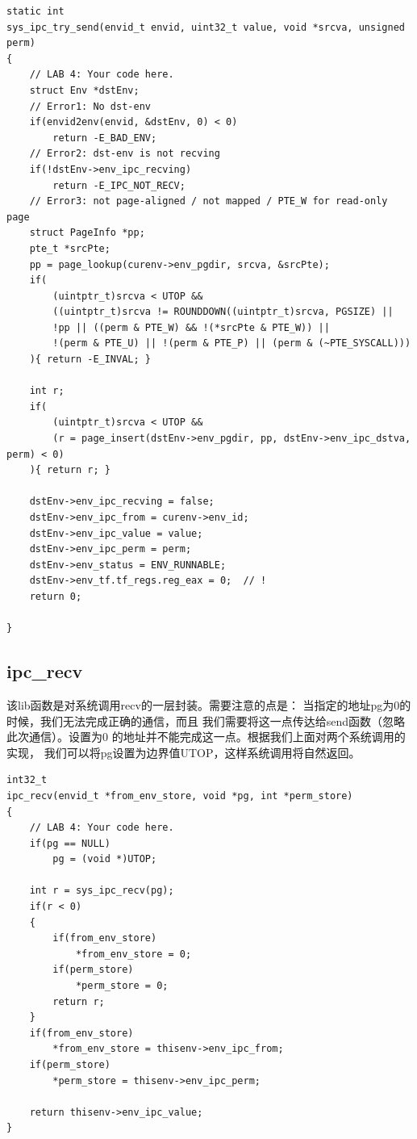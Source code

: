 \documentclass[12pt, letterpaper]{report}
\begin{document}
\lstset{style=CStyle}
\setmainfont{Consolas}
\begin{lstlisting}
static int
sys_ipc_try_send(envid_t envid, uint32_t value, void *srcva, unsigned perm)
{
    // LAB 4: Your code here.
    struct Env *dstEnv;
    // Error1: No dst-env
    if(envid2env(envid, &dstEnv, 0) < 0)
        return -E_BAD_ENV;
    // Error2: dst-env is not recving
    if(!dstEnv->env_ipc_recving)
        return -E_IPC_NOT_RECV;
    // Error3: not page-aligned / not mapped / PTE_W for read-only page
    struct PageInfo *pp;
    pte_t *srcPte;
    pp = page_lookup(curenv->env_pgdir, srcva, &srcPte);
    if(
        (uintptr_t)srcva < UTOP &&
        ((uintptr_t)srcva != ROUNDDOWN((uintptr_t)srcva, PGSIZE) ||
        !pp || ((perm & PTE_W) && !(*srcPte & PTE_W)) ||
        !(perm & PTE_U) || !(perm & PTE_P) || (perm & (~PTE_SYSCALL)))
    ){ return -E_INVAL; }

    int r;
    if(
        (uintptr_t)srcva < UTOP && 
        (r = page_insert(dstEnv->env_pgdir, pp, dstEnv->env_ipc_dstva, perm) < 0)
    ){ return r; }

    dstEnv->env_ipc_recving = false;
    dstEnv->env_ipc_from = curenv->env_id;
    dstEnv->env_ipc_value = value;
    dstEnv->env_ipc_perm = perm;
    dstEnv->env_status = ENV_RUNNABLE;
    dstEnv->env_tf.tf_regs.reg_eax = 0;  // !
    return 0;
    
}
\end{lstlisting}
\setmainfont{Times New Roman}

\newpage
\subsection{ipc\_recv}
该lib函数是对系统调用recv的一层封装。需要注意的点是：
当指定的地址pg为0的时候，我们无法完成正确的通信，而且
我们需要将这一点传达给send函数（忽略此次通信）。设置为0
的地址并不能完成这一点。根据我们上面对两个系统调用的实现，
我们可以将pg设置为边界值UTOP，这样系统调用将自然返回。\par 
\lstset{style=CStyle}
\setmainfont{Consolas}
\begin{lstlisting}
int32_t
ipc_recv(envid_t *from_env_store, void *pg, int *perm_store)
{
    // LAB 4: Your code here.
    if(pg == NULL)
        pg = (void *)UTOP;

    int r = sys_ipc_recv(pg);
    if(r < 0)
    {
        if(from_env_store)
            *from_env_store = 0;
        if(perm_store)
            *perm_store = 0;
        return r;
    }
    if(from_env_store)
        *from_env_store = thisenv->env_ipc_from;
    if(perm_store)
        *perm_store = thisenv->env_ipc_perm;
    
    return thisenv->env_ipc_value;
}
\end{lstlisting}
\setmainfont{Times New Roman}
\end{document}
